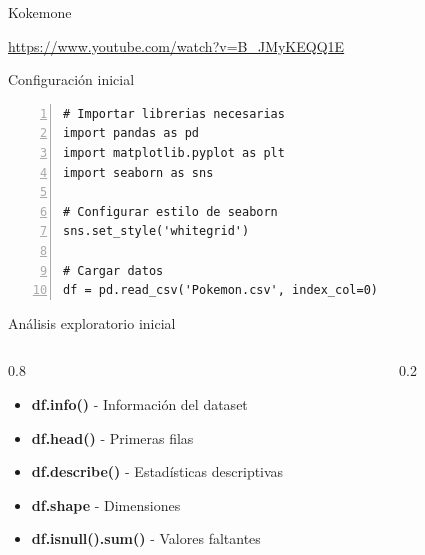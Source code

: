 \documentclass{beamer}
\begin{document}
\begin{frame}{Kokemone}
    \begin{center}
        \url{https://www.youtube.com/watch?v=B_JMyKEQQ1E}
    \end{center}
\end{frame}

\begin{frame}[fragile]{Configuración inicial}
\begin{lstlisting}[numbers=left, numbersep=5pt]
# Importar librerias necesarias
import pandas as pd
import matplotlib.pyplot as plt
import seaborn as sns

# Configurar estilo de seaborn
sns.set_style('whitegrid')

# Cargar datos
df = pd.read_csv('Pokemon.csv', index_col=0)
\end{lstlisting}
\end{frame}

\begin{frame}{Análisis exploratorio inicial}
    \begin{columns}
        \begin{column}{0.8\textwidth}
            \begin{itemize}
                \item<1->[{\makebox[1em][c]{\textcolor{black}{\faInfo}}}] \textbf{df.info()} - Información del dataset
                \item<2->[{\makebox[1em][c]{\textcolor{black}{\faList}}}] \textbf{df.head()} - Primeras filas
                \item<3->[{\makebox[1em][c]{\textcolor{black}{\faCalculator}}}] \textbf{df.describe()} - Estadísticas descriptivas
                \item<4->[{\makebox[1em][c]{\textcolor{black}{\faColumns}}}] \textbf{df.shape} - Dimensiones
                \item<5->[{\makebox[1em][c]{\textcolor{black}{\faExclamationTriangle}}}] \textbf{df.isnull().sum()} - Valores faltantes
            \end{itemize}
        \end{column}
        \begin{column}{0.2\textwidth}
            \centering
            {\fontsize{60}{60}\selectfont \faSearch}
        \end{column}
    \end{columns}
\end{frame}
\end{document}
